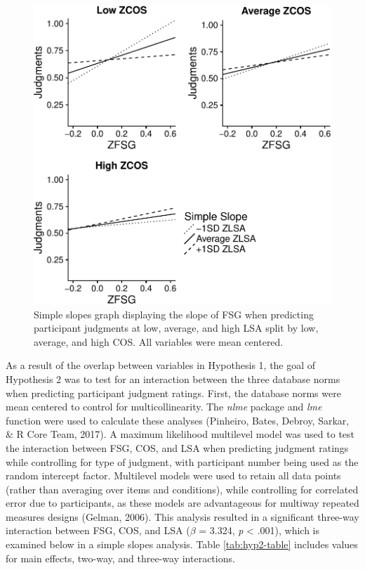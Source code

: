\documentclass[english,man]{apa6}
\theoremstyle{definition}
\theoremstyle{definition}
\theoremstyle{definition}
\theoremstyle{remark}
\begin{document}
\begin{figure}
\centering
\includegraphics{max_buch_JOL_files/figure-latex/hyp2graph-1.pdf}
\caption{\label{fig:hyp2graph}Simple slopes graph displaying the slope of
FSG when predicting participant judgments at low, average, and high LSA
split by low, average, and high COS. All variables were mean centered.}
\end{figure}

As a result of the overlap between variables in Hypothesis 1, the goal
of Hypothesis 2 was to test for an interaction between the three
database norms when predicting participant judgment ratings. First, the
database norms were mean centered to control for multicollinearity. The
\emph{nlme} package and \emph{lme} function were used to calculate these
analyses (Pinheiro, Bates, Debroy, Sarkar, \& R Core Team, 2017). A
maximum likelihood multilevel model was used to test the interaction
between FSG, COS, and LSA when predicting judgment ratings while
controlling for type of judgment, with participant number being used as
the random intercept factor. Multilevel models were used to retain all
data points (rather than averaging over items and conditions), while
controlling for correlated error due to participants, as these models
are advantageous for multiway repeated measures designs (Gelman, 2006).
This analysis resulted in a significant three-way interaction between
FSG, COS, and LSA (\(\beta\) = 3.324, \emph{p} \textless{} .001), which
is examined below in a simple slopes analysis. Table
\ref{tab:hyp2-table} includes values for main effects, two-way, and
three-way interactions.
\end{document}
